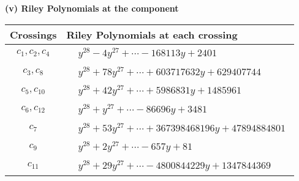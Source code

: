 \documentclass[1p]{elsarticle_modified}
\theoremstyle{definition}
\begin{document}
\flushleft \textbf{(v) Riley Polynomials at the component}\newline \\
\begin{tabular}{m{50pt}|m{274pt}}
Crossings & \hspace{64pt}Riley Polynomials at each crossing \\
\hline $$\begin{aligned}c_{1},c_{2},c_{4}\end{aligned}$$&$\begin{aligned}
&y^{28}-4 y^{27}+\cdots-168113 y+2401
\end{aligned}$\\
\hline $$\begin{aligned}c_{3},c_{8}\end{aligned}$$&$\begin{aligned}
&y^{28}+78 y^{27}+\cdots+603717632 y+629407744
\end{aligned}$\\
\hline $$\begin{aligned}c_{5},c_{10}\end{aligned}$$&$\begin{aligned}
&y^{28}+42 y^{27}+\cdots+5986831 y+1485961
\end{aligned}$\\
\hline $$\begin{aligned}c_{6},c_{12}\end{aligned}$$&$\begin{aligned}
&y^{28}+y^{27}+\cdots-86696 y+3481
\end{aligned}$\\
\hline $$\begin{aligned}c_{7}\end{aligned}$$&$\begin{aligned}
&y^{28}+53 y^{27}+\cdots+367398468196 y+47894884801
\end{aligned}$\\
\hline $$\begin{aligned}c_{9}\end{aligned}$$&$\begin{aligned}
&y^{28}+2 y^{27}+\cdots-657 y+81
\end{aligned}$\\
\hline $$\begin{aligned}c_{11}\end{aligned}$$&$\begin{aligned}
&y^{28}+29 y^{27}+\cdots-4800844229 y+1347844369
\end{aligned}$\\
\hline
\end{tabular}\\~\\
\end{document}
